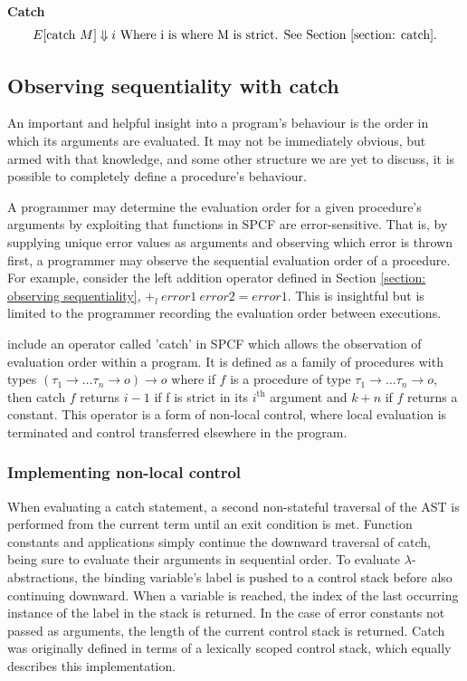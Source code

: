 \documentclass[12pt,a4paper]{report}
\theoremstyle{definition}
\theoremstyle{definition}
\theoremstyle{remark}
\begin{document}
\textbf{Catch}
\begin{equation}
    E[\text{catch}\ M] \Downarrow i \text{ Where i is where M is strict. See Section \ref{section: catch}.}
\end{equation}

\subsection{Observing sequentiality with catch}\label{section: catch}
An important and helpful insight into a program's behaviour is the order in which its arguments are evaluated. It may not be immediately obvious, but armed with that knowledge, and some other structure we are yet to discuss, it is possible to completely define a procedure's behaviour. 

A programmer may determine the evaluation order for a given procedure's arguments by exploiting that functions in SPCF are error-sensitive. That is, by supplying unique error values as arguments and observing which error is thrown first, a programmer may observe the sequential evaluation order of a procedure. For example, consider the left addition operator defined in Section \ref{section: observing sequentiality}, $+_l\ error1\ error2 = error1$. This is insightful but is limited to the programmer recording the evaluation order between executions.

\cite{cartwright_1992} include an operator called 'catch' in SPCF which allows the observation of evaluation order within a program. It is defined as a family of procedures with types $(\tau_1 \rightarrow \dots \tau_n \rightarrow o) \rightarrow o$ where if $f$ is a procedure of type $\tau_1 \rightarrow \dots \tau_n \rightarrow o$, then catch $f$ returns $i - 1$ if f is strict in its $i^{\text{th}}$ argument and $k+n$ if $f$ returns a constant. This operator is a form of non-local control, where local evaluation is terminated and control transferred elsewhere in the program.

\subsubsection{Implementing non-local control}
When evaluating a catch statement, a second non-stateful traversal of the AST is performed from the current term until an exit condition is met. Function constants and applications simply continue the downward traversal of catch, being sure to evaluate their arguments in sequential order. To evaluate $\lambda$-abstractions, the binding variable's label is pushed to a control stack before also continuing downward. When a variable is reached, the index of the last occurring instance of the label in the stack is returned. In the case of error constants not passed as arguments, the length of the current control stack is returned. Catch was originally defined in terms of a lexically scoped control stack, which equally describes this implementation.
\end{document}
